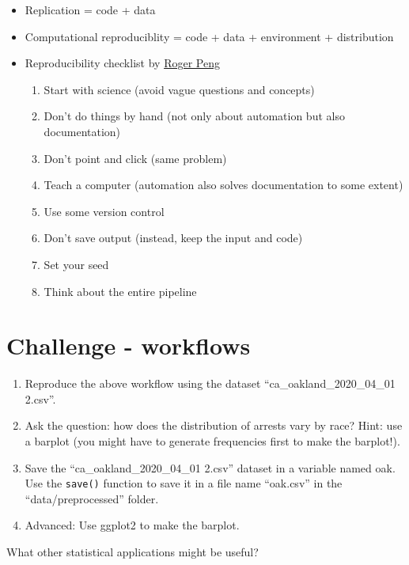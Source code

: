 \documentclass[
]{article}
\begin{document}
\begin{itemize}
\item
  Replication = code + data
\item
  Computational reproduciblity = code + data + environment +
  distribution
\item
  Reproducibility checklist by
  \href{http://www.biostat.jhsph.edu/~rpeng/}{Roger Peng}

  \begin{enumerate}
  \def\labelenumi{\arabic{enumi}.}
  \item
    Start with science (avoid vague questions and concepts)
  \item
    Don't do things by hand (not only about automation but also
    documentation)
  \item
    Don't point and click (same problem)
  \item
    Teach a computer (automation also solves documentation to some
    extent)
  \item
    Use some version control
  \item
    Don't save output (instead, keep the input and code)
  \item
    Set your seed
  \item
    Think about the entire pipeline
  \end{enumerate}
\end{itemize}

\hypertarget{challenge---workflows}{%
\section{Challenge - workflows}\label{challenge---workflows}}

\begin{enumerate}
\def\labelenumi{\arabic{enumi}.}
\item
  Reproduce the above workflow using the dataset
  ``ca\_oakland\_2020\_04\_01 2.csv''.
\item
  Ask the question: how does the distribution of arrests vary by race?
  Hint: use a barplot (you might have to generate frequencies first to
  make the barplot!).
\item
  Save the ``ca\_oakland\_2020\_04\_01 2.csv'' dataset in a variable
  named oak. Use the \texttt{save()} function to save it in a file name
  ``oak.csv'' in the ``data/preprocessed'' folder.
\item
  Advanced: Use ggplot2 to make the barplot.
\end{enumerate}

What other statistical applications might be useful?
\end{document}
